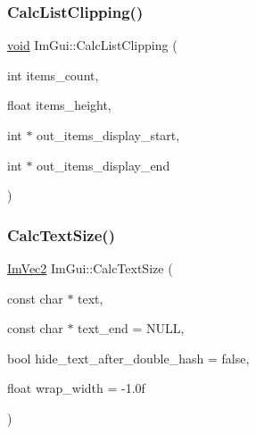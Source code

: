 \mbox{\label{namespaceImGui_ae5319370628374ef8febf0c25c285b7e}} 
\subsubsection{\texorpdfstring{Calc\+List\+Clipping()}{CalcListClipping()}}
{\footnotesize\ttfamily \hyperlink{imgui__impl__opengl3__loader_8h_ac668e7cffd9e2e9cfee428b9b2f34fa7}{void} Im\+Gui\+::\+Calc\+List\+Clipping (\begin{DoxyParamCaption}\item[{int}]{items\+\_\+count,  }\item[{float}]{items\+\_\+height,  }\item[{int $\ast$}]{out\+\_\+items\+\_\+display\+\_\+start,  }\item[{int $\ast$}]{out\+\_\+items\+\_\+display\+\_\+end }\end{DoxyParamCaption})}

\mbox{\label{namespaceImGui_a848b9db6cc4a186751c0ecebcaadc33b}} 
\subsubsection{\texorpdfstring{Calc\+Text\+Size()}{CalcTextSize()}}
{\footnotesize\ttfamily \hyperlink{structImVec2}{Im\+Vec2} Im\+Gui\+::\+Calc\+Text\+Size (\begin{DoxyParamCaption}\item[{const char $\ast$}]{text,  }\item[{const char $\ast$}]{text\+\_\+end = {\ttfamily NULL},  }\item[{bool}]{hide\+\_\+text\+\_\+after\+\_\+double\+\_\+hash = {\ttfamily false},  }\item[{float}]{wrap\+\_\+width = {\ttfamily -\/1.0f} }\end{DoxyParamCaption})}

\mbox{\label{namespaceImGui_ab9804506fa0fe8823f63eadb3043916f}} 
